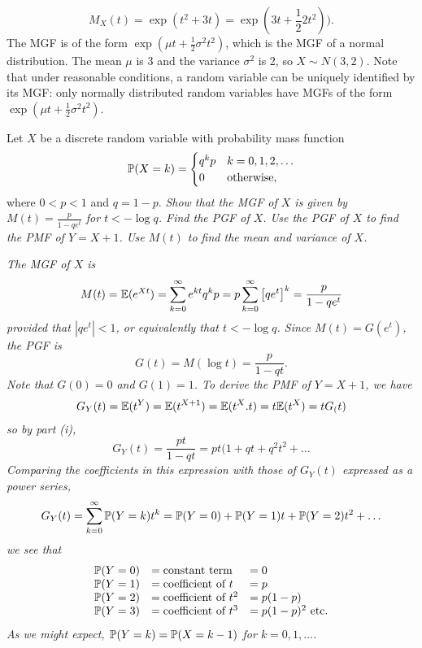 \begin{exercise}
\begin{questions}
\begin{answer}
\[
M_{X}(t) = \exp(t^{2} + 3t) = \exp(3t + \frac{1}{2}2t^2)).
\]
The MGF is of the form $\exp(\mu t + \frac{1}{2}\sigma^2 t^2)$, which is the MGF of a normal distribution. The mean $\mu$ is 3 and the variance $\sigma^2$ is 2, so $X\sim N(3, 2)$. Note that under reasonable conditions, a random variable can be uniquely identified by its MGF: only normally distributed random variables have MGFs of the form $\exp(\mu t + \frac{1}{2}\sigma^2 t^2)$. 
\end{answer}


\question
Let $X$ be a discrete random variable with probability mass function
\[
\mathbb{P}(X=k) = \begin{cases}
	q^k p		& k=0,1,2,\ldots \\
	0			& \text{otherwise},
\end{cases}	
\]
where $0<p<1$ and $q=1-p$. 
\ben
\it %
Show that the MGF of $X$ is given by $M(t) = \displaystyle\frac{p}{1-qe^t}$ for $t < -\log q$.
\it %
Find the PGF of $X$.
\it %
Use the PGF of $X$ to find the PMF of $Y = X + 1$.
\it %
Use $M(t)$ to find the mean and variance of $X$.
\een

\begin{answer}
\ben
\it %
The MGF of $X$ is
\begin{align*}
M(t) 
	= \mathbb{E}(e^{Xt}) 
	= \sum\limits_{k=0}^{\infty }e^{kt} q^k p 
	= p\sum\limits_{k=0}^{\infty }\big[qe^{t}\big]^k 
	= \frac{p}{1-qe^{t}}
\end{align*}
provided that $|qe^{t}|<1$, or equivalently that $t<-\log q$.
\it %
Since $M(t) = G(e^t)$, the PGF is
\[
G(t) = M(\log t) = \frac{p}{1-qt} .
\]
Note that $G(0)=0$ and $G(1)=1$.
\it %
To derive the PMF of $Y=X+1$, we have
\[
G_Y(t) = \mathbb{E}(t^Y) = \mathbb{E}(t^{X+1}) = \mathbb{E}(t^X.t) = t\mathbb{E}(t^X) = t G_(t)
\]
so by part (i),
\[
G_Y(t) = \frac{pt}{1-qt} = pt(1 + qt + q^2t^2 + \ldots
\]
Comparing the coefficients in this expression with those of $G_Y(t)$ expressed as a power series,
\[
G_Y(t) = \sum_{k=0}^{\infty} \mathbb{P}(Y=k) t^k = \mathbb{P}(Y=0) + \mathbb{P}(Y=1)t + \mathbb{P}(Y=2)t^2 + \ldots
\]
we see that 
\[\begin{array}{lll}
\mathbb{P}(Y = 0) & = \text{constant term} 			& = 0 \\
\mathbb{P}(Y = 1) & = \text{coefficient of $t$} 		& = p \\
\mathbb{P}(Y = 2) & = \text{coefficient of $t^2$}		& = p(1 - p) \\
\mathbb{P}(Y = 3) & = \text{coefficient of $t^3$}		& = p(1 - p)^2 \text{ etc.}
\end{array}\]
As we might expect, $\mathbb{P}(Y = k) = \mathbb{P}(X = k - 1)$ for $k = 0,1,\ldots$.


\end{answer}
\end{questions}
\end{exercise}
